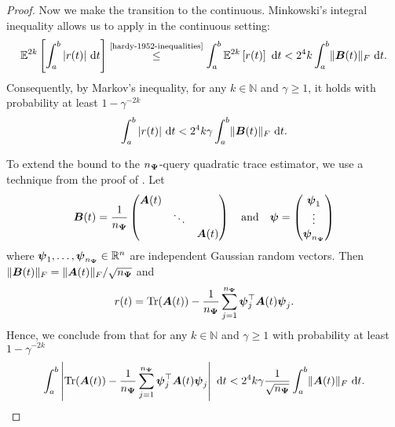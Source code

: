 \documentclass[12pt]{article}
\begin{document}
\begin{proof}
    Now we make the transition to the continuous. Minkowski's integral inequality \cite[theorem 202]{hardy-1952-inequalities} allows us to apply  in the continuous setting: 
    \begin{equation}
        \mathbb{E}^{2 k}\left[ \int_{a}^{b} |r(t)|~\mathrm{d}t  \right]
        \stackrel{\text{\cite{hardy-1952-inequalities}}}{\leq} \int_{a}^{b} \mathbb{E}^{2 k}\left[ r(t) \right]~\mathrm{d}t
        < 2^4 k \int_{a}^{b} \lVert \mtx{B}(t) \rVert _F~\mathrm{d}t.
    \end{equation}
    Consequently, by Markov's inequality, for any $k \in \mathbb{N}$ and $\gamma \geq 1$, it holds with probability at least $1 - \gamma^{-2 k}$
    \begin{equation}
        \int_{a}^{b} |r(t)|~\mathrm{d}t < 2^4 k \gamma \int_{a}^{b} \lVert \boldsymbol{B}(t) \rVert _F~\mathrm{d}t.
        \label{equ:hutchinson-trace-onequery-uniform}
    \end{equation}

    To extend the bound to the $n_{\boldsymbol{\Psi}}$-query quadratic trace estimator, we use a technique from the proof of \cite[theorem 1]{cortinovis-2022-randomized-trace}. Let
    \begin{equation}
        \boldsymbol{B}(t)
        = \frac{1}{n_{\boldsymbol{\Psi}}} \begin{pmatrix}
            \boldsymbol{A}(t) & & \\
            & \ddots & \\
            & & \boldsymbol{A}(t)
        \end{pmatrix}
        \quad \text{and} \quad
        \boldsymbol{\psi} = \begin{pmatrix}
            \boldsymbol{\psi}_1 \\
            \vdots \\
            \boldsymbol{\psi}_{n_{\boldsymbol{\Psi}}}
        \end{pmatrix}
    \end{equation}
    where $\boldsymbol{\psi}_1, \dots, \boldsymbol{\psi}_{n_{\boldsymbol{\Psi}}} \in \mathbb{R}^{n}$ are independent Gaussian random vectors. Then $\lVert \boldsymbol{B}(t) \rVert _F = \lVert \boldsymbol{A}(t) \rVert _F / \sqrt{n_{\boldsymbol{\Psi}}}$ and
    \begin{equation}
        r(t) = \operatorname{Tr}(\boldsymbol{A}(t)) - \frac{1}{n_{\boldsymbol{\Psi}}} \sum_{j=1}^{n_{\boldsymbol{\Psi}}} \boldsymbol{\psi}_j^{\top} \boldsymbol{A}(t) \boldsymbol{\psi}_j.
    \end{equation}
    Hence, we conclude from  that for any $k \in \mathbb{N}$ and $\gamma \geq 1$ with probability at least $1 - \gamma^{-2 k}$
    \begin{equation}
        \int_{a}^{b} \left| \operatorname{Tr}(\boldsymbol{A}(t)) - \frac{1}{n_{\boldsymbol{\Psi}}} \sum_{j=1}^{n_{\boldsymbol{\Psi}}} \boldsymbol{\psi}_j^{\top} \boldsymbol{A}(t) \boldsymbol{\psi}_j \right| ~ \mathrm{d}t
        < 2^4 k \gamma \frac{1}{\sqrt{n_{\boldsymbol{\Psi}}}} \int_{a}^{b} \lVert \boldsymbol{A}(t) \rVert _F~\mathrm{d}t.
    \end{equation}


\end{proof}
\end{document}
